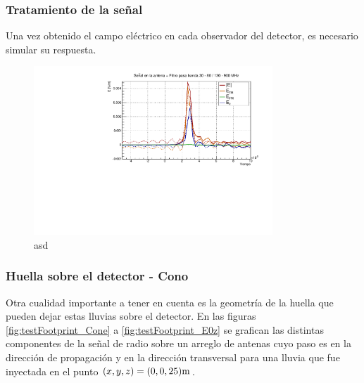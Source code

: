 	\subsubsection{Tratamiento de la se\~nal}
	\label{sbsc:tratSig}
	
	Una vez obtenido el campo eléctrico en cada observador del detector, es necesario simular su respuesta.
	
	
	\begin{figure}[ht!]
		\centering
		\includegraphics[width=0.8\textwidth]{./fig/simulacionRadio/antennaFilt}
		\caption{\label{fig:antHEnv}
		asd
		}
	\end{figure}
	
	
	
	\subsubsection{Huella sobre el detector - Cono \cher}
	
	Otra cualidad importante a tener en cuenta es la geometría de la huella que pueden dejar estas lluvias sobre el detector.
	En las figuras \ref{fig:testFootprint_Cone} a \ref{fig:testFootprint_E0z} se grafican las distintas componentes de la se\~nal de radio sobre un arreglo de antenas cuyo paso es  en la dirección de propagación y  en la dirección transversal para una lluvia que fue inyectada en el punto $(x,y,z)=(0,0,25){\rm m}$.
	
